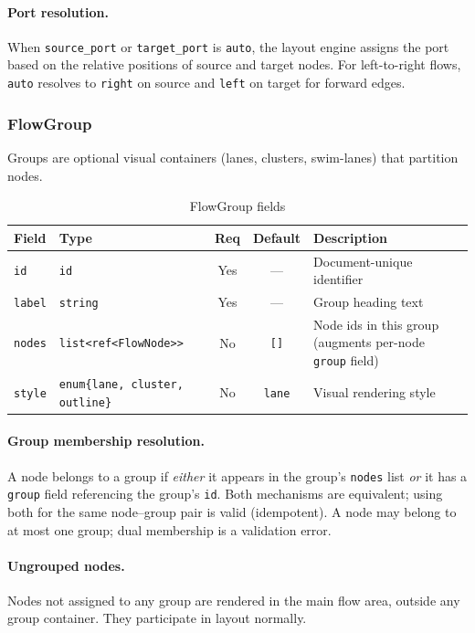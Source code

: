 \paragraph{Port resolution.}
When \texttt{source\_port} or \texttt{target\_port} is \texttt{auto}, the layout engine assigns the port based on the relative positions of source and target nodes. For left-to-right flows, \texttt{auto} resolves to \texttt{right} on source and \texttt{left} on target for forward edges.

\subsubsection{FlowGroup}
\label{sec:flow-group}

Groups are optional visual containers (lanes, clusters, swim-lanes) that partition nodes.

\begin{table}[h]
\centering
\small
\begin{tabular}{llccp{4.5cm}}
\toprule
\textbf{Field} & \textbf{Type} & \textbf{Req} & \textbf{Default} & \textbf{Description} \\
\midrule
\texttt{id} & \texttt{id} & Yes & --- & Document-unique identifier \\
\texttt{label} & \texttt{string} & Yes & --- & Group heading text \\
\texttt{nodes} & \texttt{list<ref<FlowNode>>} & No & \texttt{[]} & Node ids in this group (augments per-node \texttt{group} field) \\
\texttt{style} & \texttt{enum\{lane, cluster, outline\}} & No & \texttt{lane} & Visual rendering style \\
\bottomrule
\end{tabular}
\caption{FlowGroup fields}
\label{tab:flow-group-fields}
\end{table}

\paragraph{Group membership resolution.}
A node belongs to a group if \emph{either} it appears in the group's \texttt{nodes} list \emph{or} it has a \texttt{group} field referencing the group's \texttt{id}. Both mechanisms are equivalent; using both for the same node--group pair is valid (idempotent). A node may belong to at most one group; dual membership is a validation error.

\paragraph{Ungrouped nodes.}
Nodes not assigned to any group are rendered in the main flow area, outside any group container. They participate in layout normally.

